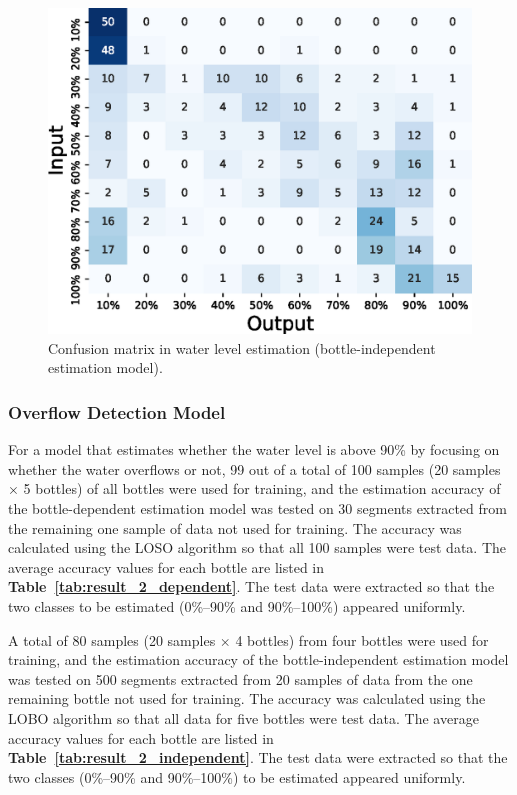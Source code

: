 \documentclass[manuscript,screen,review]{acmart}
\newcommand\tabref[1]{\textbf{Table~\ref{tab:#1}}}
\begin{document}
\begin{figure}[!t]
\begin{minipage}[t]{0.45\linewidth}
    \includegraphics[width=0.9\linewidth]{figures/confusion_matrix_10_independent_tokkuri.eps}
  \end{minipage}
  \caption{Confusion matrix in water level estimation (bottle-independent estimation model).}
  \label{fig:confusion_matrix_10_independent}
\end{figure}

\subsubsection{Overflow Detection Model}
For a model that estimates whether the water level is above 90\% by focusing on whether the water overflows or not, 99 out of a total of 100 samples (20 samples $\times$ 5 bottles) of all bottles were used for training, and the estimation accuracy of the bottle-dependent estimation model was tested on 30 segments extracted from the remaining one sample of data not used for training. The accuracy was calculated using the LOSO algorithm so that all 100 samples were test data. The average accuracy values for each bottle are listed in \tabref{result_2_dependent}. The test data were extracted so that the two classes to be estimated (0\%--90\% and 90\%--100\%) appeared uniformly.\par

A total of 80 samples (20 samples $\times$ 4 bottles) from four bottles were used for training, and the estimation accuracy of the bottle-independent estimation model was tested on 500 segments extracted from 20 samples of data from the one remaining bottle not used for training. The accuracy was calculated using the LOBO algorithm so that all data for five bottles were test data. The average accuracy values for each bottle are listed in \tabref{result_2_independent}. The test data were extracted so that the two classes (0\%--90\% and 90\%--100\%) to be estimated appeared uniformly.\par
\end{document}
